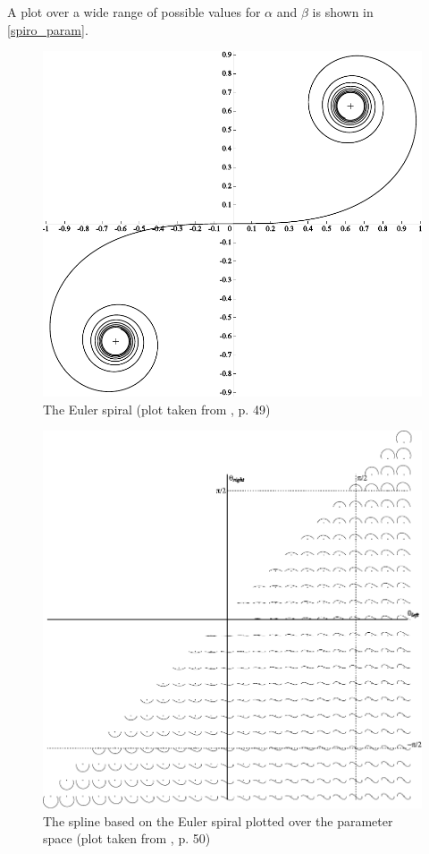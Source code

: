 A plot over a wide range of possible values for $\alpha$ and $\beta$ is shown in \autoref{spiro_param}.

\begin{figure}
\includegraphics[width=\textwidth]{images/smooth/euler_spiral.pdf}
\caption{The Euler spiral (plot taken from \cite{levien2009spiral}, p. 49)}
\end{figure}

\begin{figure}
\includegraphics[width=\textwidth]{images/smooth/euler_spline_primitive.pdf}
\caption{The spline based on the Euler spiral plotted over the parameter space (plot taken from \cite{levien2009spiral}, p. 50)}\label{spiro_param}
\end{figure}

